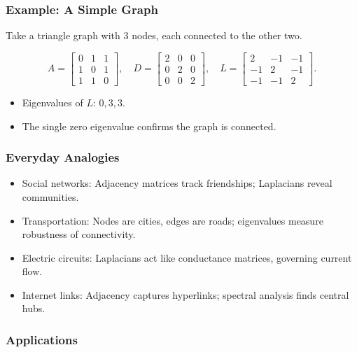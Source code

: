 \documentclass[
  letterpaper,
  DIV=11,
  numbers=noendperiod]{scrreprt}
\providecommand{\tightlist}{%
  \setlength{\itemsep}{0pt}\setlength{\parskip}{0pt}}
\begin{document}
\subsubsection{Example: A Simple Graph}\label{example-a-simple-graph}

Take a triangle graph with 3 nodes, each connected to the other two.

\[
A = \begin{bmatrix} 
0 & 1 & 1 \\ 
1 & 0 & 1 \\ 
1 & 1 & 0 
\end{bmatrix}, \quad 
D = \begin{bmatrix} 
2 & 0 & 0 \\ 
0 & 2 & 0 \\ 
0 & 0 & 2 
\end{bmatrix}, \quad 
L = \begin{bmatrix} 
2 & -1 & -1 \\ 
-1 & 2 & -1 \\ 
-1 & -1 & 2 
\end{bmatrix}.
\]

\begin{itemize}
\tightlist
\item
  Eigenvalues of \(L\): \(0, 3, 3\).
\item
  The single zero eigenvalue confirms the graph is connected.
\end{itemize}

\subsubsection{Everyday Analogies}\label{everyday-analogies-88}

\begin{itemize}
\tightlist
\item
  Social networks: Adjacency matrices track friendships; Laplacians
  reveal communities.
\item
  Transportation: Nodes are cities, edges are roads; eigenvalues measure
  robustness of connectivity.
\item
  Electric circuits: Laplacians act like conductance matrices, governing
  current flow.
\item
  Internet links: Adjacency captures hyperlinks; spectral analysis finds
  central hubs.
\end{itemize}

\subsubsection{Applications}\label{applications-50}
\end{document}
